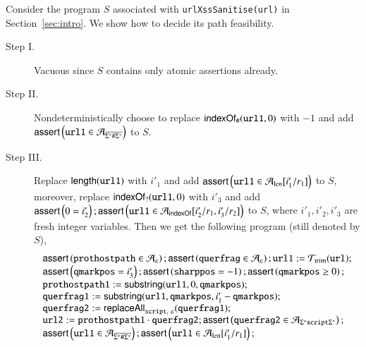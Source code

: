 \begin{example}
	Consider the program $S$ associated with {\tt urlXssSanitise(url)} in Section~\ref{sec:intro}. %
	We show how to decide its path feasibility. %
	\begin{description}
		\item[Step I.]   Vacuous since $S$ contains only atomic assertions already. %
		\item[Step II.] Nondeterministically choose to replace $\mathsf{indexOf}_\#(\mathtt{url1}, 0)$ with $-1$ and add $\textsf{assert}\left(\mathtt{url1} \in \mathcal{A}_{\overline{\Sigma^*\#\Sigma^*}}\right)$ to $S$.  
		\item[Step III.] Replace $\mathsf{length}(\mathtt{url1})$ with $i'_1$ and add $\textsf{assert}\left(\mathtt{url1} \in \mathcal{A}_{\rm len}[i'_1/r_1]\right)$ to $S$, moreover, replace $\mathsf{indexOf}_?(\mathtt{url1}, 0)$ with $i'_3$ and add $\textsf{assert}\left(0= i'_2\right); \textsf{assert}\left(\mathtt{url1} \in \mathcal{A}_{\mathsf{indexOf}}[i'_2/r_1, i'_3/r_2]\right)$ to $S$, where $i'_1, i'_2, i'_3$ are fresh integer variables. Then we get the following program (still denoted by $S$), 
		\[ 
		\begin{array}{l}
		\ASSERT{\mathtt{prothostpath} \in \NFA_\varepsilon}; \ASSERT{\mathtt{querfrag} \in \NFA_\varepsilon}; \mathtt{url1} := \NFT_{\rm trim}(\mathtt{url}); \\
		\ASSERT{\mathtt{qmarkpos} = i'_3}; \ASSERT{\mathtt{sharppos} =-1 }; \ASSERT{\mathtt{qmarkpos} \ge 0}; \\ 
		\mathtt{prothostpath1} := \substring(\mathtt{url1}, 0, \mathtt{qmarkpos});\\
		\mathtt{querfrag1} := \substring(\mathtt{url1, qmarkpos}, i'_1 - \mathtt{qmarkpos});\\
		\mathtt{querfrag2} := \replaceall_{\mathtt{script},\ \varepsilon}(\mathtt{querfrag1});\\
		\mathtt{url2} := \mathtt{prothostpath1} \concat \mathtt{querfrag2}; \ASSERT{\mathtt{querfrag2} \in  \NFA_{\Sigma^*\mathtt{script}\Sigma^*}};  \\
		\ASSERT{\mathtt{url1} \in  \NFA_{\overline{\Sigma^*\#\Sigma^*}}}; \ASSERT{\mathtt{url1} \in \CEFA_{\rm len}[i'_1/r_1]}; \\

\end{array}\]
\end{description}
\end{example}
